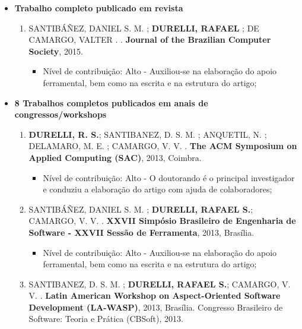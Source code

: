 \begin{itemize}
	\item \textbf{Trabalho completo publicado em revista}
			
			\begin{enumerate}
			    \item SANTIBÁÑEZ, DANIEL S. M. ; \textbf{DURELLI, RAFAEL} ; DE CAMARGO, VALTER . . \textbf{Journal of the Brazilian Computer Society}, 2015.
			  \begin{itemize}
			        \item Nível de contribuição: Alto - Auxiliou-se na elaboração do apoio ferramental, bem como na escrita e na estrutura do artigo;
			    \end{itemize}
			\end{enumerate}
	\item \textbf{8 Trabalhos completos publicados em anais de congressos/workshops}
	\begin{enumerate}
	 	
	 	\item \textbf{DURELLI, R. S.}; SANTIBANEZ, D. S. M. ; ANQUETIL, N. ; DELAMARO, M. E. ; CAMARGO, V. V. . \textbf{The ACM Symposium on Applied Computing (SAC)}, 2013, Coimbra.
	 	
	 	    \begin{itemize}
			        \item Nível de contribuição: Alto - O doutorando é o principal investigador e conduziu a elaboração do artigo com ajuda de colaboradores;
			    \end{itemize}
		
		\item SANTIBÁÑEZ, DANIEL S. M. ; \textbf{DURELLI, RAFAEL S.}; CAMARGO, V. V. . \textbf{XXVII Simpósio Brasileiro de Engenharia de Software - XXVII Sessão de Ferramenta}, 2013, Brasília.
		    \begin{itemize}
			        \item Nível de contribuição: Alto - Auxiliou-se na elaboração do apoio ferramental, bem como na escrita e na estrutura do artigo;
			    \end{itemize}
		
		\item SANTIBANEZ, D. S. M. ; \textbf{DURELLI, RAFAEL S.}; CAMARGO, V. V. . \textbf{Latin American Workshop on Aspect-Oriented Software Development (LA-WASP)}, 2013, Brasília. Congresso Brasileiro de Software: Teoria e Prática (CBSoft), 2013.
		

\end{enumerate}
\end{itemize}
